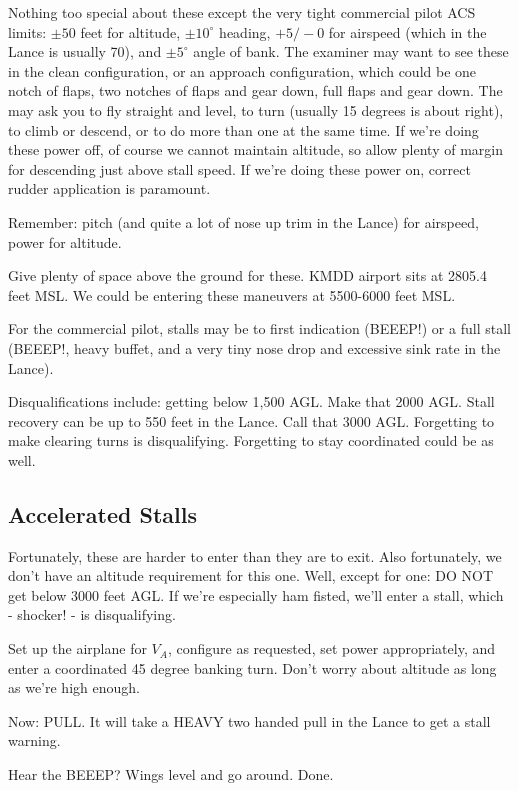 Nothing too special about these except the very tight commercial pilot ACS limits: $\pm50$ feet for altitude, $\pm10^\circ$ heading, $+5/-0$ for airspeed (which in the Lance is usually 70), and $\pm5^\circ$ angle of bank. The examiner may want to see these in the clean configuration, or an approach configuration, which could be one notch of flaps, two notches of flaps and gear down, full flaps and gear down. The may ask you to fly straight and level, to turn (usually 15 degrees is about right), to climb or descend, or to do more than one at the same time. If we're doing these power off, of course we cannot maintain altitude, so allow plenty of margin for descending just above stall speed. If we're doing these power on, correct rudder application is paramount.

Remember: pitch (and quite a lot of nose up trim in the Lance) for airspeed, power for altitude.

Give plenty of space above the ground for these. KMDD airport sits at 2805.4 feet MSL. We could be entering these maneuvers at 5500-6000 feet MSL.

For the commercial pilot, stalls may be to first indication (BEEEP!) or a full stall (BEEEP!, heavy buffet, and a very tiny nose drop and excessive sink rate in the Lance).

Disqualifications include: getting below 1,500 AGL. Make that 2000 AGL. Stall recovery can be up to 550 feet in the Lance. Call that 3000 AGL. Forgetting to make clearing turns is disqualifying. Forgetting to stay coordinated could be as well.

\subsection{Accelerated Stalls}

Fortunately, these are harder to enter than they are to exit. Also fortunately, we don't have an altitude requirement for this one. Well, except for one: DO NOT get below 3000 feet AGL. If we're especially ham fisted, we'll enter a stall, which - shocker! - is disqualifying.

Set up the airplane for $V_A$, configure as requested, set power appropriately, and enter a coordinated 45 degree banking turn. Don't worry about altitude as long as we're high enough.

Now: PULL. It will take a HEAVY two handed pull in the Lance to get a stall warning.

Hear the BEEEP? Wings level and go around. Done.


